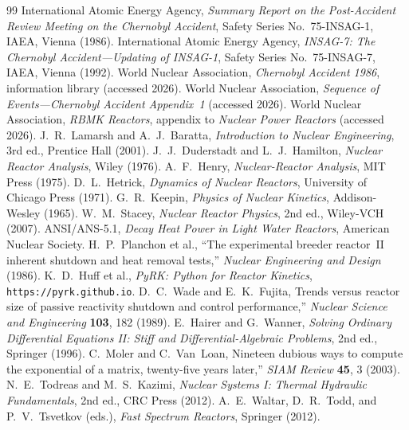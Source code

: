 \begin{thebibliography}{99}
 International Atomic Energy Agency, \emph{Summary Report on the
Post-Accident Review Meeting on the Chernobyl Accident}, Safety Series
No.~75-INSAG-1, IAEA, Vienna (1986).
 International Atomic Energy Agency, \emph{INSAG-7: The Chernobyl
Accident---Updating of INSAG-1}, Safety Series No.~75-INSAG-7, IAEA, Vienna
(1992).
 World Nuclear Association, \emph{Chernobyl Accident 1986},
information library (accessed 2026).
 World Nuclear Association, \emph{Sequence of Events---Chernobyl
Accident Appendix~1} (accessed 2026).
 World Nuclear Association, \emph{RBMK Reactors}, appendix to
\emph{Nuclear Power Reactors} (accessed 2026).
 J.~R.~Lamarsh and A.~J.~Baratta, \emph{Introduction to Nuclear
Engineering}, 3rd ed., Prentice Hall (2001).
 J.~J.~Duderstadt and L.~J.~Hamilton, \emph{Nuclear Reactor
Analysis}, Wiley (1976).
 A.~F.~Henry, \emph{Nuclear-Reactor Analysis}, MIT Press (1975).
 D.~L.~Hetrick, \emph{Dynamics of Nuclear Reactors}, University of
Chicago Press (1971).
 G.~R.~Keepin, \emph{Physics of Nuclear Kinetics}, Addison-Wesley
(1965).
 W.~M.~Stacey, \emph{Nuclear Reactor Physics}, 2nd ed.,
Wiley-VCH (2007).
 ANSI/ANS-5.1, \emph{Decay Heat Power in Light Water Reactors},
American Nuclear Society.
 H.~P.~Planchon et al., ``The experimental breeder reactor~II
inherent shutdown and heat removal tests,'' \emph{Nuclear Engineering and Design}
(1986).
 K.~D.~Huff et al., \emph{PyRK: Python for Reactor Kinetics},
\texttt{https://pyrk.github.io}.
 D.~C.~Wade and E.~K.~Fujita, Trends versus reactor size of passive reactivity shutdown and control performance,'' \emph{Nuclear Science and Engineering} \textbf{103}, 182 (1989).
 E.~Hairer and G.~Wanner, \emph{Solving Ordinary Differential Equations II: Stiff and Differential-Algebraic Problems}, 2nd ed., Springer (1996).
 C.~Moler and C.~Van~Loan, Nineteen dubious ways to compute the exponential of a matrix, twenty-five years later,'' \emph{SIAM Review} \textbf{45}, 3 (2003).
 N.~E.~Todreas and M.~S.~Kazimi, \emph{Nuclear Systems I: Thermal Hydraulic Fundamentals}, 2nd ed., CRC Press (2012).
 A.~E.~Waltar, D.~R.~Todd, and P.~V.~Tsvetkov (eds.), \emph{Fast Spectrum Reactors}, Springer (2012).
\end{thebibliography}
